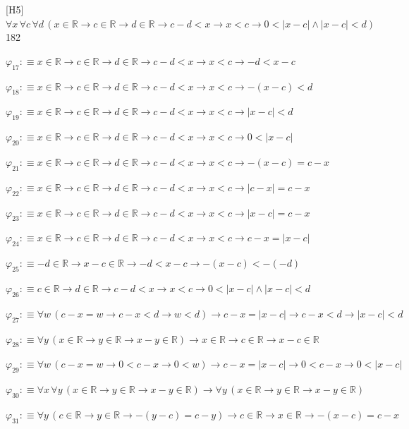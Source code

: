 \begin{fullproof}{[H5]}{$\forall x\,\forall c\,\forall d\,(x \in \mathbb{R} \to c \in \mathbb{R} \to d \in \mathbb{R} \to c - d < x \to x < c \to 0 < \lvert x - c \rvert \land \lvert x - c \rvert < d)$}{182}
\begin{abbrevlist}
\item $\varphi_{17} :\equiv x \in \mathbb{R} \to c \in \mathbb{R} \to d \in \mathbb{R} \to c - d < x \to x < c \to -d < x - c$
\item $\varphi_{18} :\equiv x \in \mathbb{R} \to c \in \mathbb{R} \to d \in \mathbb{R} \to c - d < x \to x < c \to -(x - c) < d$
\item $\varphi_{19} :\equiv x \in \mathbb{R} \to c \in \mathbb{R} \to d \in \mathbb{R} \to c - d < x \to x < c \to \lvert x - c \rvert < d$
\item $\varphi_{20} :\equiv x \in \mathbb{R} \to c \in \mathbb{R} \to d \in \mathbb{R} \to c - d < x \to x < c \to 0 < \lvert x - c \rvert$
\item $\varphi_{21} :\equiv x \in \mathbb{R} \to c \in \mathbb{R} \to d \in \mathbb{R} \to c - d < x \to x < c \to -(x - c) = c - x$
\item $\varphi_{22} :\equiv x \in \mathbb{R} \to c \in \mathbb{R} \to d \in \mathbb{R} \to c - d < x \to x < c \to \lvert c - x \rvert = c - x$
\item $\varphi_{23} :\equiv x \in \mathbb{R} \to c \in \mathbb{R} \to d \in \mathbb{R} \to c - d < x \to x < c \to \lvert x - c \rvert = c - x$
\item $\varphi_{24} :\equiv x \in \mathbb{R} \to c \in \mathbb{R} \to d \in \mathbb{R} \to c - d < x \to x < c \to c - x = \lvert x - c \rvert$
\item $\varphi_{25} :\equiv -d \in \mathbb{R} \to x - c \in \mathbb{R} \to -d < x - c \to -(x - c) < -(-d)$
\item $\varphi_{26} :\equiv c \in \mathbb{R} \to d \in \mathbb{R} \to c - d < x \to x < c \to 0 < \lvert x - c \rvert \land \lvert x - c \rvert < d$
\item $\varphi_{27} :\equiv \forall w\,(c - x = w \to c - x < d \to w < d) \to c - x = \lvert x - c \rvert \to c - x < d \to \lvert x - c \rvert < d$
\item $\varphi_{28} :\equiv \forall y\,(x \in \mathbb{R} \to y \in \mathbb{R} \to x - y \in \mathbb{R}) \to x \in \mathbb{R} \to c \in \mathbb{R} \to x - c \in \mathbb{R}$
\item $\varphi_{29} :\equiv \forall w\,(c - x = w \to 0 < c - x \to 0 < w) \to c - x = \lvert x - c \rvert \to 0 < c - x \to 0 < \lvert x - c \rvert$
\item $\varphi_{30} :\equiv \forall x\,\forall y\,(x \in \mathbb{R} \to y \in \mathbb{R} \to x - y \in \mathbb{R}) \to \forall y\,(x \in \mathbb{R} \to y \in \mathbb{R} \to x - y \in \mathbb{R})$
\item $\varphi_{31} :\equiv \forall y\,(c \in \mathbb{R} \to y \in \mathbb{R} \to -(y - c) = c - y) \to c \in \mathbb{R} \to x \in \mathbb{R} \to -(x - c) = c - x$

\end{abbrevlist}
\end{fullproof}
